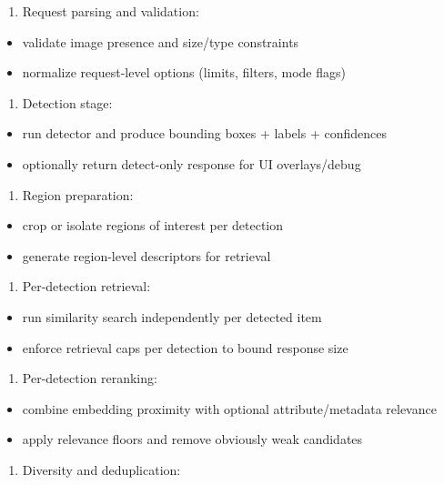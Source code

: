 \documentclass[12pt,a4paper]{report}
\begin{document}
\begin{enumerate}
\item Request parsing and validation:
\end{enumerate}
\begin{itemize}
\item validate image presence and size/type constraints
\item normalize request-level options (limits, filters, mode flags)
\end{itemize}
\begin{enumerate}
\item Detection stage:
\end{enumerate}
\begin{itemize}
\item run detector and produce bounding boxes + labels + confidences
\item optionally return detect-only response for UI overlays/debug
\end{itemize}
\begin{enumerate}
\item Region preparation:
\end{enumerate}
\begin{itemize}
\item crop or isolate regions of interest per detection
\item generate region-level descriptors for retrieval
\end{itemize}
\begin{enumerate}
\item Per-detection retrieval:
\end{enumerate}
\begin{itemize}
\item run similarity search independently per detected item
\item enforce retrieval caps per detection to bound response size
\end{itemize}
\begin{enumerate}
\item Per-detection reranking:
\end{enumerate}
\begin{itemize}
\item combine embedding proximity with optional attribute/metadata relevance
\item apply relevance floors and remove obviously weak candidates
\end{itemize}
\begin{enumerate}
\item Diversity and deduplication:
\end{enumerate}
\end{document}
